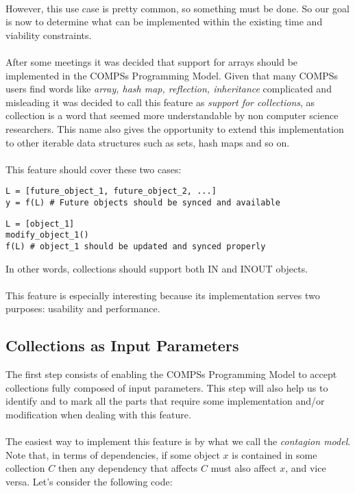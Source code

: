 \\
However, this use case is pretty common, so something must be done. So our goal is now to determine what can be implemented within the existing time and viability constraints.\\
\\
After some meetings it was decided that support for arrays should be implemented in the COMPSs Programming Model. Given that many COMPSs users find words like \textit{array, hash map, reflection, inheritance} complicated and misleading it was decided to call this feature as \textit{support for collections}, as collection is a word that seemed more understandable by non computer science researchers. This name also gives the opportunity to extend this implementation to other iterable data structures such as sets, hash maps and so on.\\
\\
This feature should cover these two cases:
\begin{verbatim}
L = [future_object_1, future_object_2, ...]
y = f(L) # Future objects should be synced and available
\end{verbatim}

\begin{verbatim}
L = [object_1]
modify_object_1()
f(L) # object_1 should be updated and synced properly
\end{verbatim}
In other words, collections should support both IN and INOUT objects.\\
\\
This feature is especially interesting because its implementation serves two purposes: usability and performance.

\subsection{Collections as Input Parameters}
\label{subsec:col_in}
The first step consists of enabling the COMPSs Programming Model to accept collections fully composed of input parameters. This step will also help us to identify and to mark all the parts that require some implementation and/or modification when dealing with this feature.\\
\\
The easiest way to implement this feature is by what we call the \textit{contagion model}. Note that, in terms of dependencies, if some object $x$ is contained in some collection $C$ then any dependency that affects $C$ must also affect $x$, and vice versa. Let's consider the following code:

